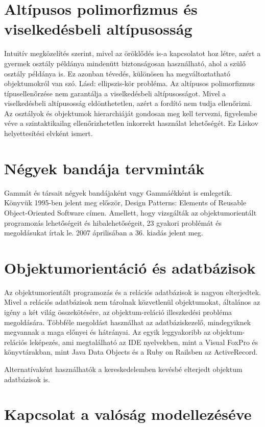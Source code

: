 \documentclass[a4paper,12pt,twoside]{report}
\theoremstyle{definition}
\begin{document}
	\section{Altípusos polimorfizmus és viselkedésbeli altípusosság}
	
	Intuitív megközelítés szerint, mivel az öröklődés is-a kapcsolatot hoz létre, azért a gyermek osztály példánya mindenütt biztonságosan használható, ahol a szülő osztály példánya is. Ez azonban tévedés, különösen ha megváltoztatható objektumokról van szó. Lásd: ellipszis-kör probléma. Az altípusos polimorfizmus típusellenőrzése nem garantálja a viselkedésbeli altípusosságot. Mivel a viselkedésbeli altípusosság eldönthetetlen, azért a fordító nem tudja ellenőrizni. Az osztályok és objektumok hierarchiáját gondosan meg kell tervezni, figyelembe véve a szintaktikailag ellenőrizhetetlen inkorrekt használat lehetőségét. Ez Liskov helyettesítési elvként ismert.
	
	\section{Négyek bandája tervminták}
	
	Gammát és társait négyek bandájaként vagy Gammáékként is emlegetik. Könyvük 1995-ben jelent meg először, Design Patterns: Elements of Reusable Object-Oriented Software címen. Amellett, hogy vizsgálták az objektumorientált programozás lehetőségeit és hibalehetőségeit, 23 gyakori problémát és megoldásukat írtak le. 2007 áprilisában a 36. kiadás jelent meg.
	
	\section{Objektumorientáció és adatbázisok}
	
	Az objektumorientált programozás és a relációs adatbázisok is nagyon elterjedtek. Mivel a relációs adatbázisok nem tárolnak közvetlenül objektumokat, általános az igény a két világ összekötésére, az objektum-reláció illeszkedési probléma megoldására. Többféle megoldást használhat az adatbáziskezelő, mindegyiknek megvannak a maga előnyei és hátrányai.\cite{Neward} Az egyik leggyakoribb az objektum-relációs leképezés, ami megtalálható az IDE nyelvekben, mint a Visual FoxPro és könyvtárakban, mint Java Data Objects és a Ruby on Railsben az ActiveRecord.
	
	Alternatívaként használhatók a kereskedelemben kevésbé elterjedt objektum adatbázisok is.
	
	\section{Kapcsolat a valóság modellezéséve}
	
\end{document}
